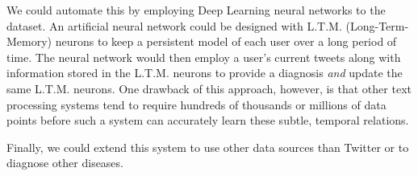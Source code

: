 We could automate this by employing Deep Learning\cite{LeCun:2015dt} neural networks to the dataset. An artificial neural network could be designed with L.T.M. (Long-Term-Memory) neurons\cite{el1995hierarchical,ferrari2008constrained,Pascanu:2012tw,LeCun:2015dt} to keep a persistent model of each user over a long period of time. The neural network would then employ a user's current tweets along with information stored in the L.T.M. neurons to provide a diagnosis \emph{and} update the same L.T.M. neurons. One drawback of this approach, however, is that other text processing systems\cite{sutskever2011generating,Graves:2013wt} tend to require hundreds of thousands or millions of data points before such a system can accurately learn these subtle, temporal relations.

Finally, we could extend this system to use other data sources than Twitter or to diagnose other diseases.
%
%

